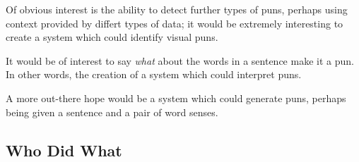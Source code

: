 \documentclass{article}
\begin{document}
Of obvious interest is the ability to detect further types of puns, perhaps
using context provided by differt types of data; it would be extremely
interesting to create a system which could identify visual puns. 

It would be of interest to say \emph{what} about the words in a sentence make it
a pun. In other words, the creation of a system which could interpret puns.

A more out-there hope would be a system which could generate puns, perhaps being
given a sentence and a pair of word senses.

\subsection{Who Did What}

\begin{itemize}


\end{itemize}
\end{document}
